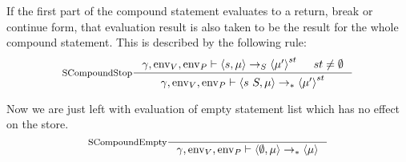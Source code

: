 \documentclass[a4paper, 10pt, draft]{report}
\newcommand{\mycode}[1]{\ensuremath{\mbox{\lstinline{#1}}}}
\begin{document}
If the first part of the compound statement evaluates to a return, break or
continue form, that evaluation result is also taken to be the result for the
whole compound statement. This is described by the following rule:
\[
\inference[SCompoundStop]
  { %
    \gamma, \operatorname{env}_V, \operatorname{env}_P |- \left\langle
      s, \mu
    \right\rangle ->_S \left\langle
      \mu'
    \right\rangle^{st} & st \neq \emptyset
  }{ %
    \gamma, \operatorname{env}_V, \operatorname{env}_P |- \left\langle
      s\ S, \mu
      \right\rangle ->_{*} \left\langle
      \mu'
    \right\rangle^{st}
  }\\[2em]
\]

Now we are just left with evaluation of empty statement list which has no
effect on the store. \[
\inference[SCompoundEmpty]
  {}%
  { %
    \gamma, \operatorname{env}_V, \operatorname{env}_P |- \left\langle
      \emptyset, \mu
    \right\rangle ->_{*} \left\langle
      \mu
    \right\rangle
  }\\[2em]
\]
\end{document}
